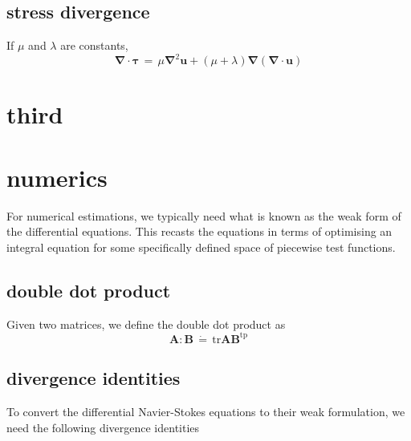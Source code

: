 \documentclass[11pt,a4paper]{report}
\begin{document}
\subsection{stress divergence}
If $\mu$ and $\lambda$ are constants,
\begin{equation}
\boldsymbol{\nabla}\cdot\boldsymbol{\tau}\,=\,\mu\boldsymbol{\nabla}^{2}\boldsymbol{u}+(\mu+\lambda)\boldsymbol{\nabla}\left(\boldsymbol{\nabla}\cdot\boldsymbol{u}\right)
\end{equation}

\section{third}



\section{numerics}

For numerical estimations, we typically need what is known as the weak form of the differential equations. This recasts the equations in terms of optimising an integral equation for some specifically defined space of piecewise test functions. 

\subsection{double dot product}
Given two matrices, we define the double dot product as
\begin{equation}
\boldsymbol{A}:\boldsymbol{B}\,\dot{=}\,\mathrm{tr}\boldsymbol{A}\boldsymbol{B}^{\mathrm{tp}}
\end{equation}

\subsection{divergence identities}

To convert the differential Navier-Stokes equations to their weak formulation, we need the following divergence identities
\end{document}
